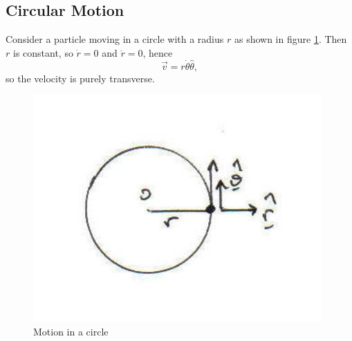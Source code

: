 \subsection{Circular Motion}

Consider a particle moving in a circle with a radius $r$ as shown in figure \ref{fig:circular-motion}. Then $r$ is constant, so $\dot{r} = 0$ and $\ddot{r} = 0$, hence
\begin{equation}
    \vec{v} = r \dot{\theta} \hat{\theta},
\end{equation}
so the velocity is purely transverse. 

\begin{figure}[h!]
    \centering
    \includegraphics[scale=0.6]{notes/images/Circular-Motion.JPG}
    \caption{Motion in a circle}
    \label{fig:circular-motion}
\end{figure}
\FloatBarrier

